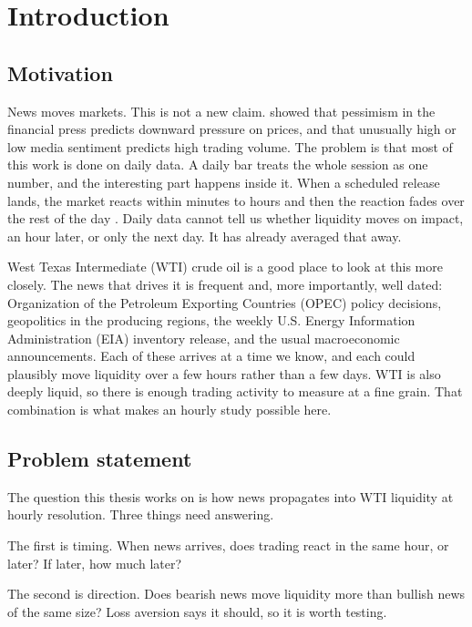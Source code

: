 \chapter{Introduction}\label{chap:introduction}

\section{Motivation}\label{sec:motivation}

News moves markets. This is not a new claim. \citet{tetlock2007} showed that pessimism in the financial press predicts downward pressure on prices, and that unusually high or low media sentiment predicts high trading volume. The problem is that most of this work is done on daily data. A daily bar treats the whole session as one number, and the interesting part happens inside it. When a scheduled release lands, the market reacts within minutes to hours and then the reaction fades over the rest of the day \citep{ederington1993}. Daily data cannot tell us whether liquidity moves on impact, an hour later, or only the next day. It has already averaged that away.

West Texas Intermediate (WTI) crude oil is a good place to look at this more closely. The news that drives it is frequent and, more importantly, well dated: Organization of the Petroleum Exporting Countries (OPEC) policy decisions, geopolitics in the producing regions, the weekly U.S. Energy Information Administration (EIA) inventory release, and the usual macroeconomic announcements. Each of these arrives at a time we know, and each could plausibly move liquidity over a few hours rather than a few days. WTI is also deeply liquid, so there is enough trading activity to measure at a fine grain. That combination is what makes an hourly study possible here.

\section{Problem statement}\label{sec:problem-statement}

The question this thesis works on is how news propagates into WTI liquidity at hourly resolution. Three things need answering.

The first is timing. When news arrives, does trading react in the same hour, or later? If later, how much later?

The second is direction. Does bearish news move liquidity more than bullish news of the same size? Loss aversion says it should, so it is worth testing.

